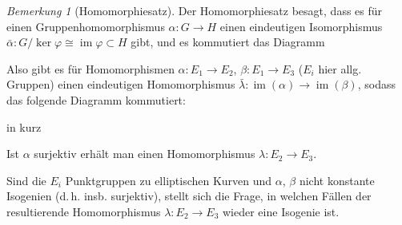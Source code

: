 \documentclass[english, german, parskip=half]{scrartcl}
\theoremstyle{definition}
\theoremstyle{remark}
\newtheorem{Bemerkung}[Satz]{Bemerkung}
\DeclareMathOperator{\im}{im} %
\begin{document}
\begin{Bemerkung}[Homomorphiesatz]
  Der Homomorphiesatz besagt, dass es für
  einen Gruppenhomomorphismus $\alpha\colon G\to H$ einen eindeutigen
  Isomorphismus 
  $\bar\alpha\colon G/\ker\varphi\cong \im\varphi\subset H$ gibt, und
  es kommutiert das Diagramm
  \begin{center}
  \end{center}
  Also gibt es für Homomorphismen $\alpha\colon E_1\to E_2$,
  $\beta\colon E_1\to E_3$ ($E_i$ hier allg. Gruppen) einen eindeutigen
  Homomorphismus $\bar\lambda\colon \im(\alpha)\to\im(\beta)$, 
  sodass das folgende Diagramm kommutiert:
  \begin{center}
    \hfill
    in kurz
    \hfill
  \end{center}
  Ist $\alpha$ surjektiv erhält man einen Homomorphismus
  $\lambda\colon E_2\to E_3$.
\end{Bemerkung}

Sind die $E_i$ Punktgruppen zu elliptischen Kurven 
und $\alpha$, $\beta$ nicht konstante Isogenien (d.\,h. insb. surjektiv),
stellt sich die Frage, in welchen Fällen der resultierende
Homomorphismus $\lambda\colon E_2\to E_3$ wieder eine Isogenie ist.
\end{document}
